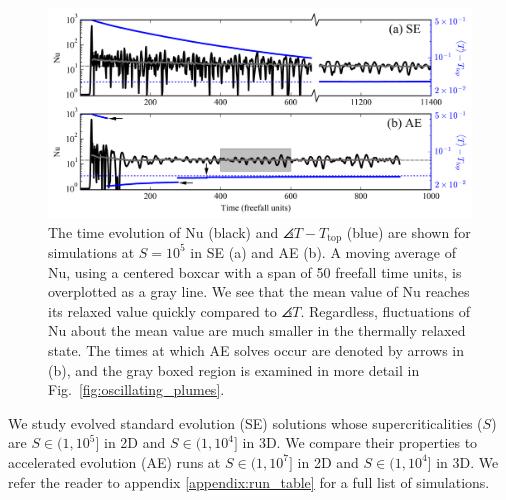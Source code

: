 \begin{figure}[bt!]
\includegraphics[width=\textwidth]{./figs/nu_v_time.pdf}
\caption[Time evolution of the Nusselt number in AE vs.~SE]
{
	The time evolution of Nu (black) and $\angles{T} - T_{\text{top}}$ (blue) are shown for simulations at $S = 10^5$ in SE (a) and AE (b).
	A moving average of Nu, using a centered boxcar with a span of 50 freefall time units, is overplotted as a gray line. 
	We see that the mean value of Nu reaches its relaxed value quickly compared to $\angles{T}$.
	Regardless, fluctuations of Nu about the mean value are much smaller in the thermally relaxed state.
	The times at which AE solves occur are denoted by arrows in (b), and the gray boxed region is examined in more detail in Fig.~\ref{fig:oscillating_plumes}.
	\label{fig:nu_v_time} 
}
\end{figure}


We study evolved standard evolution (SE) solutions whose supercriticalities ($S$) are $S \in (1, 10^5]$ in 2D and $S \in (1, 10^4]$ in 3D.
We compare their properties to accelerated evolution (AE) runs at $S \in (1, 10^7]$ in 2D and $S \in (1, 10^4]$ in 3D. 
We refer the reader to appendix \ref{appendix:run_table} for a full list of simulations.

